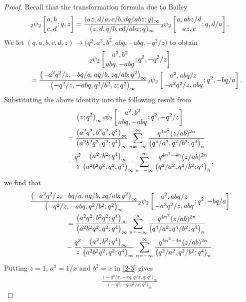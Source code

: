 \documentclass[10pt,a4paper]{amsart}
\numberwithin{equation}{section}
\begin{document}
\begin{proof}
Recall that the transformation formula due to Bailey \cite[equation~(2.3)]{Ba}
\begin{align*}
_2\psi_2\left[{a,b \atop c,d};q,z\right]
=\frac{(az,d/a,c/b,dq/abz;q)_{\infty}}
{(z,d,q/b,cd/abz;q)_{\infty}}
{_2\psi_2}\left[{a,abz/d \atop az,c};q,d/a\right].
\end{align*}
We let $(q,a,b,c,d,z)\rightarrow\bigl(q^2,a^2,b^2,abq,-abq,-q^2/z\bigr)$ to obtain
\begin{gather*}
{_2\psi_2}\left[{a^2, b^2 \atop abq,-abq};q^2,-q^2/z\right]\\
\qquad=\frac{\bigl(-a^2q^2/z,-bq/a,aq/b,zq/ab;q^2\bigr)_{\infty}}
{\bigl(-q^2/z,-abq,q^2/b^2,z;q^2\bigr)_{\infty}}
{_2\psi_2}\left[{a^2,abq/z \atop -a^2q^2/z,abq};q^2,-bq/a\right].
\end{gather*}
Substituting the above identity into the following result from \cite[Theorem 2.3]{HZ}
\begin{gather}
\bigl(z;q^2\bigr)_{\infty}{_2\psi_2}\left[{a^2, b^2 \atop abq,-abq};q^2,-q^2/z\right]\nonumber\\
\qquad=\frac{\bigl(a^2q^2,b^2q^2;q^4\bigr)_{\infty}}{\bigl(a^2b^2q^2,q^2;q^4\bigr)_{\infty}}
\sum_{n=-\infty}^{\infty}\frac{q^{4n^2}(z/ab)^{2n}}
{\bigl(q^4/a^2,q^4/b^2;q^4\bigr)_n}\nonumber\\
\phantom{\qquad=}{}-\frac{q^2}{z}\frac{\bigl(a^2,b^2;q^4\bigr)_{\infty}}{\bigl(a^2b^2q^2,q^2;q^4\bigr)_{\infty}}
\sum_{n=-\infty}^{\infty}\frac{q^{4n^2-4n}(z/ab)^{2n}}
{\bigl(q^2/a^2,q^2/b^2;q^4\bigr)_n},\label{2-2}
\end{gather}
we find that
\begin{gather}
\frac{\bigl(-a^2q^2/z,-bq/a,aq/b,zq/ab;q^2\bigr)_{\infty}}
{\bigl(-q^2/z,-abq,q^2/b^2;q^2\bigr)_{\infty}}
{_2\psi_2}\left[{a^2,abq/z \atop -a^2q^2/z,abq};q^2,-bq/a\right]\nonumber\\
\qquad=\frac{\bigl(a^2q^2,b^2q^2;q^4\bigr)_{\infty}}{\bigl(a^2b^2q^2,q^2;q^4\bigr)_{\infty}}
\sum_{n=-\infty}^{\infty}\frac{q^{4n^2}(z/ab)^{2n}}
{\bigl(q^4/a^2,q^4/b^2;q^4\bigr)_n}\nonumber\\
\phantom{\qquad=}{}-\frac{q^2}{z}\frac{\bigl(a^2,b^2;q^4\bigr)_{\infty}}{\bigl(a^2b^2q^2,q^2;q^4\bigr)_{\infty}}
\sum_{n=-\infty}^{\infty}\frac{q^{4n^2-4n}(z/ab)^{2n}}
{\bigl(q^2/a^2,q^2/b^2;q^4\bigr)_n}.\label{2-3}
\end{gather}
Putting $z=1$, $a^2=1/x$ and $b^2=x$ in \eqref{2-3} gives
\begin{gather}
\frac{\bigl(-q^2/x,-xq,q/x,q;q^2\bigr)_{\infty}}{\bigl(-q^2,-q,q^2/x;q^2\bigr)_{\infty}}

\end{gather}
\end{proof}
\end{document}

